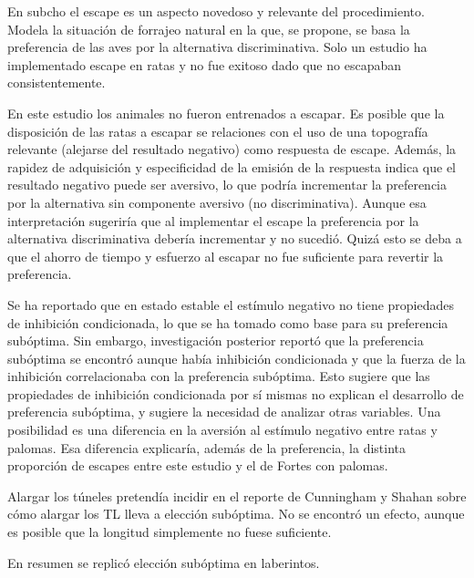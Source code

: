 \documentclass[a4paper,12pt]{article}
\begin{document}
En subcho el escape es un aspecto novedoso y relevante del procedimiento.
Modela la situación de forrajeo natural en la que, se propone, se basa la preferencia de las aves por la alternativa discriminativa.
Solo un estudio ha implementado escape en ratas y no fue exitoso dado que no escapaban consistentemente.

En este estudio los animales no fueron entrenados a escapar.
Es posible que la disposición de las ratas a escapar se relaciones con el uso de una topografía relevante (alejarse del resultado negativo) como respuesta de escape.
Además, la rapidez de adquisición y especificidad de la emisión de la respuesta indica que el resultado negativo puede ser aversivo, lo que podría incrementar la preferencia por la alternativa sin componente aversivo (no discriminativa).
Aunque esa interpretación sugeriría que al implementar el escape la preferencia por la alternativa discriminativa debería incrementar y no sucedió.
Quizá esto se deba a que el ahorro de tiempo y esfuerzo al escapar no fue suficiente para revertir la preferencia.

Se ha reportado que en estado estable el estímulo negativo no tiene propiedades de inhibición condicionada, lo que se ha tomado como base para su preferencia subóptima.
Sin embargo, investigación posterior reportó que la preferencia subóptima se encontró aunque había inhibición condicionada y que la fuerza de la inhibición correlacionaba con la preferencia subóptima.
Esto sugiere que las propiedades de inhibición condicionada por sí mismas no explican el desarrollo de preferencia subóptima, y sugiere la necesidad de analizar otras variables.
Una posibilidad es una diferencia en la aversión al estímulo negativo entre ratas y palomas.
Esa diferencia explicaría, además de la preferencia, la distinta proporción de escapes entre este estudio y el de Fortes con palomas.

Alargar los túneles pretendía incidir en el reporte de Cunningham y Shahan sobre cómo alargar los TL lleva a elección subóptima.
No se encontró un efecto, aunque es posible que la longitud simplemente no fuese suficiente.

En resumen se replicó elección subóptima en laberintos.
\end{document}
